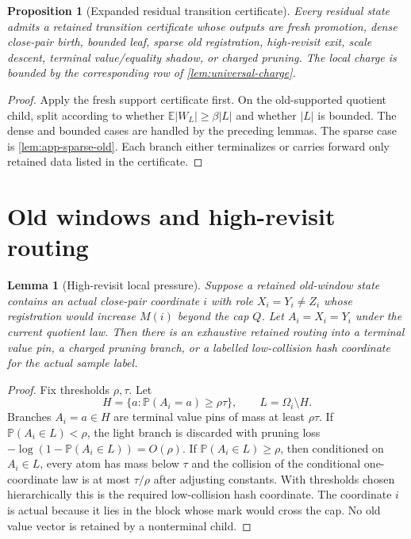 \documentclass[11pt]{article}
\newcommand{\Cref}[1]{\ref{#1}}
\newtheorem{lemma}[theorem]{Lemma}
\newtheorem{proposition}[theorem]{Proposition}
\theoremstyle{remark}
\newcommand{\E}{\mathbb E}
\newcommand{\Prob}{\mathbb P}
\begin{document}
\begin{proposition}[Expanded residual transition certificate]\label{prop:app-residual-certificate}
Every residual state admits a retained transition certificate whose outputs are fresh promotion, dense close-pair birth, bounded leaf, sparse old registration, high-revisit exit, scale descent, terminal value/equality shadow, or charged pruning.  The local charge is bounded by the corresponding row of \Cref{lem:universal-charge}.
\end{proposition}

\begin{proof}
Apply the fresh support certificate first.  On the old-supported quotient child, split according to whether $\E|W_L|\ge \beta |L|$ and whether $|L|$ is bounded.  The dense and bounded cases are handled by the preceding lemmas.  The sparse case is \Cref{lem:app-sparse-old}.  Each branch either terminalizes or carries forward only retained data listed in the certificate.
\end{proof}

\section{Old windows and high-revisit routing}\label{app:old-window}

\begin{lemma}[High-revisit local pressure]\label{lem:app-high-revisit}
Suppose a retained old-window state contains an actual close-pair coordinate $i$ with role $X_i=Y_i\ne Z_i$ whose registration would increase $M(i)$ beyond the cap $Q$.  Let $A_i=X_i=Y_i$ under the current quotient law.  Then there is an exhaustive retained routing into a terminal value pin, a charged pruning branch, or a labelled low-collision hash coordinate for the actual sample label.
\end{lemma}

\begin{proof}
Fix thresholds $\rho,\tau$.  Let
\[
        H=\{a:\Prob(A_i=a)\ge \rho\tau\},\qquad L=\Omega_i\setminus H.
\]
Branches $A_i=a\in H$ are terminal value pins of mass at least $\rho\tau$.  If $\Prob(A_i\in L)<\rho$, the light branch is discarded with pruning loss $-\log(1-\Prob(A_i\in L))=O(\rho)$.  If $\Prob(A_i\in L)\ge \rho$, then conditioned on $A_i\in L$, every atom has mass below $\tau$ and the collision of the conditional one-coordinate law is at most $\tau/\rho$ after adjusting constants.  With thresholds chosen hierarchically this is the required low-collision hash coordinate.  The coordinate $i$ is actual because it lies in the block whose mark would cross the cap.  No old value vector is retained by a nonterminal child.
\end{proof}
\end{document}
